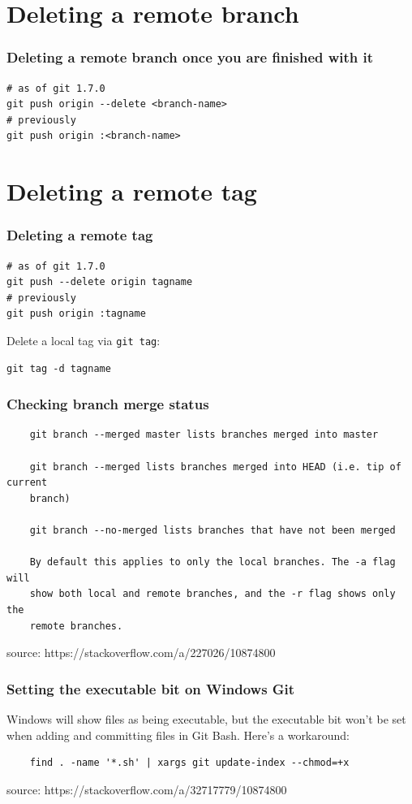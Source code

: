 \documentclass{git_course}
\begin{document}
\section{Deleting a remote branch}

\begin{frame}[fragile]
    \frametitle{Deleting a remote branch once you are finished with it}

\begin{lstlisting}
# as of git 1.7.0
git push origin --delete <branch-name>
# previously
git push origin :<branch-name>
\end{lstlisting}
\end{frame}

\section{Deleting a remote tag}

\begin{frame}[fragile]
\frametitle{Deleting a remote tag}

\begin{lstlisting}
# as of git 1.7.0
git push --delete origin tagname
# previously
git push origin :tagname
\end{lstlisting}

Delete a local tag via \texttt{git tag}:
\begin{lstlisting}
git tag -d tagname
\end{lstlisting}
\end{frame}

\begin{frame}[fragile]
\frametitle{Checking branch merge status}
    \begin{lstlisting}
    git branch --merged master lists branches merged into master

    git branch --merged lists branches merged into HEAD (i.e. tip of current
    branch)

    git branch --no-merged lists branches that have not been merged

    By default this applies to only the local branches. The -a flag will
    show both local and remote branches, and the -r flag shows only the
    remote branches.
    \end{lstlisting}
    source: https://stackoverflow.com/a/227026/10874800
\end{frame}

\begin{frame}[fragile]
\frametitle{Setting the executable bit on Windows Git}
Windows will show files as being executable, but the executable bit won't be
set when adding and committing files in Git Bash.  Here's a workaround:
    \begin{lstlisting}
    find . -name '*.sh' | xargs git update-index --chmod=+x
    \end{lstlisting}
    source: https://stackoverflow.com/a/32717779/10874800
\end{frame}
\end{document}

